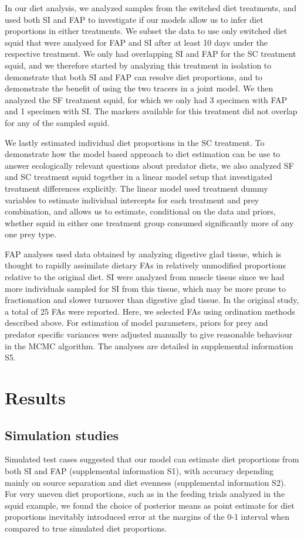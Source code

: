 \documentclass[fleqn,10pt]{wlpeerj}
\begin{document}
In our diet analysis, we analyzed samples from the switched diet treatments, and
used both SI and FAP to investigate if our models allow us to infer diet
proportions in either treatments. We subset the data to use only
switched diet squid that were analysed for FAP and SI after at least
10 days under the respective treatment. We only had overlapping
SI and FAP for the SC treatment squid, and we therefore started by analyzing this treatment in isolation to
demonstrate that both SI and FAP can resolve diet proportions, and to
demonstrate the benefit of using the two tracers in a joint model. We
then analyzed the SF treatment squid, for which we only had 3 specimen with FAP
and 1 specimen with SI. The markers available for this treatment did
not overlap for any of the sampled squid. 

We lastly estimated individual diet proportions in the SC
treatment. To demonstrate how the model based approach to diet estimation can be
use to answer ecologically relevant questions about predator
diets, we also analyzed SF and SC treatment squid together in a linear model
setup that investigated treatment differences explicitly. The linear
model used treatment dummy variables to estimate individual intercepts
for each treatment and prey combination, and allows us to estimate,
conditional on the data and priors, whether squid in either one
treatment group consumed significantly more of any one prey type.

FAP analyses used data obtained by analyzing digestive glad tissue, which is thought to
rapidly assimilate dietary FAs in relatively unmodified
proportions relative to the original diet. SI were analyzed from
muscle tissue since we had more individuals sampled for SI from this tissue, which may be more prone to fractionation and slower
turnover than digestive glad tissue. In the original study, a total of
25 FAs were reported. Here, we selected FAs using ordination
methods described above. For estimation of model parameters, priors for
prey and predator specific variances were adjusted manually to give
reasonable behaviour in the MCMC algorithm. The analyses are detailed
in supplemental information S5.

\section*{Results}

\subsection*{Simulation studies}
Simulated test cases suggested that our model can estimate diet
proportions from both SI and FAP (supplemental information S1), with
accuracy depending mainly on source separation and diet evenness (supplemental information S2). For very
uneven diet proportions, such as in the feeding trials analyzed in the
squid example, we found the choice of posterior means as point estimate for diet
proportions inevitably introduced error at the margins of
the 0-1 interval when compared to true simulated diet
proportions.
\end{document}
